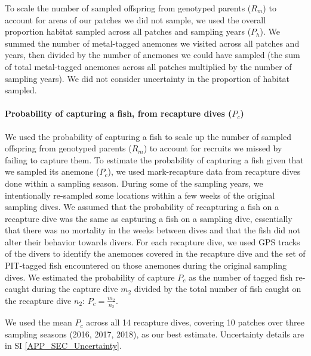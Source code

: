 \documentclass[12pt, oneside]{article}   	%
\begin{document}
To scale the number of sampled offspring from genotyped parents ($R_m$) to account for areas of our patches we did not sample, we used the overall proportion habitat sampled across all patches and sampling years ($P_h$). We summed the number of metal-tagged anemones we visited across all patches and years, then divided by the number of anemones we could have sampled (the sum of total metal-tagged anemones across all patches multiplied by the number of sampling years). We did not consider uncertainty in the proportion of habitat sampled.

\paragraph*{Probability of capturing a fish, from recapture dives ($P_c$)} %

We used the probability of capturing a fish to scale up the number of sampled offspring from genotyped parents ($R_m$) to account for recruits we missed by failing to capture them. To estimate the probability of capturing a fish given that we sampled its anemone ($P_c$), we used mark-recapture data from recapture dives done within a sampling season. During some of the sampling years, we intentionally re-sampled some locations within a few weeks of the original sampling dives. We assumed that the probability of recapturing a fish on a recapture dive was the same as capturing a fish on a sampling dive, essentially that there was no mortality in the weeks between dives and that the fish did not alter their behavior towards divers. For each recapture dive, we used GPS tracks of the divers to identify the anemones covered in the recapture dive and the set of PIT-tagged fish encountered on those anemones during the original sampling dives. We estimated the probability of capture $P_c$ as the number of tagged fish re-caught during the capture dive $m_2$ divided by the total number of fish caught on the recapture dive $n_2$: $P_c = \frac{m_2}{n_2}$. %

We used the mean $P_c$ across all 14 recapture dives, covering 10 patches over three sampling seasons (2016, 2017, 2018), as our best estimate. Uncertainty details are in SI \ref{APP_SEC_Uncertainty}.

\end{document}
